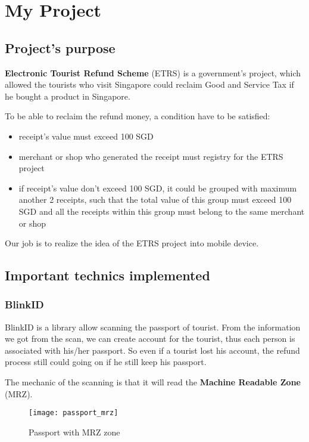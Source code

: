 \chapter{My Project}

\section{Project's purpose}\label{condition}

\textbf{Electronic Tourist Refund Scheme} (ETRS) is a government's project, which allowed the tourists who visit Singapore could reclaim Good and Service Tax if he bought a product in Singapore.

To be able to reclaim the refund money, a condition have to be satisfied: 
\begin{itemize}
	\item receipt's value must exceed 100 SGD
	\item merchant or shop who generated the receipt must registry for the ETRS project
	\item if receipt's value don't exceed 100 SGD, it could be grouped with maximum another 2 receipts, such that the total value of this group must exceed 100 SGD and all the receipts within this group must belong to the same merchant or shop
\end{itemize}



Our job is to realize the idea of the ETRS project into mobile device. 

\section{Important technics implemented}

\subsection{BlinkID}
BlinkID is a library allow scanning the passport of tourist. From the information we got from the scan, we can create account for the tourist, thus each person is associated with his/her passport. So even if a tourist lost his account, the refund process still could going on if he still keep his passport.

The mechanic of the scanning is that it will read the \textbf{Machine Readable Zone} (MRZ). 

\begin{figure}
\centering
\texttt{[image: passport\_mrz]}
\caption{Passport with MRZ zone}
\end{figure}

